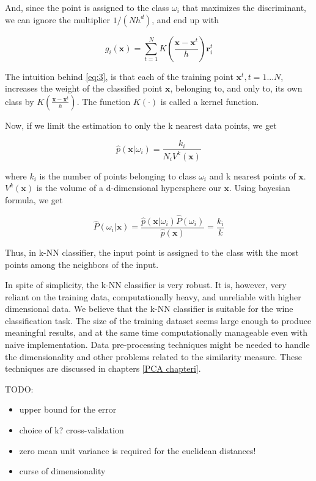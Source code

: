 And, since the point is assigned to the class $\omega_{i}$ that maximizes the discriminant, we can ignore the multiplier $1/(Nh^{d})$, and end up with

\begin{equation}
  \label{eq:3}
  g_{i}(\mathbf{x}) = \sum_{t=1}^{N}K(\frac{\mathbf{x} - \mathbf{x}^{t}}{h})\mathbf{r}_{i}^{t}
\end{equation}

The intuition behind \eqref{eq:3}, is that each of the training point $\mathbf{x}^t, t = 1...N$, increases the weight of the classified point $\mathbf{x}$, belonging to, and only to, its own class by $K(\frac{\mathbf{x} - \mathbf{x}^{t}}{h})$. The function $K(\cdot)$ is called a kernel function.

Now, if we limit the estimation to only the k nearest data points, we get

\begin{equation*}
  \label{eq:4}
  \hat{p}(\mathbf{x} | \omega_{i}) = \frac{k_{i}}{N_{i}V^{k}(\mathbf{x})}
\end{equation*}

where $k_{i}$ is the number of points belonging to class $\omega_{i}$ and k nearest points of $\mathbf{x}$. $V^{k}(\mathbf{x})$ is the volume of a d-dimensional hypersphere our $\mathbf{x}$. Using bayesian formula, we get

\begin{equation*}
  \label{eq:5}
  \hat{P}(\omega_{i}|\mathbf{x}) = \frac{\hat{p}(\mathbf{x}|\omega_{i})\hat{P}(\omega_{i})}{\hat{p}(\mathbf{x})} = \frac{k_i}{k}
\end{equation*}

Thus, in k-NN classifier, the input point is assigned to the class with the most points among the neighbors of the input.

In spite of simplicity, the k-NN classifier is very robust. It is, however, very reliant on the
training data, computationally heavy, and unreliable with higher dimensional data. We believe that the k-NN classifier is suitable for the wine classification task. The size of the training dataset seems large enough to produce meaningful results, and at the same time computationally manageable even with naive implementation. Data pre-processing techniques might be needed to handle the dimensionality and other problems related to the similarity measure. These techniques are discussed in chapters \ref{PCA chapteri}.

TODO:
\begin{itemize}
\item upper bound for the error
\item choice of k? cross-validation
\item zero mean unit variance is required for the euclidean distances!
\item curse of dimensionality
\end{itemize}

